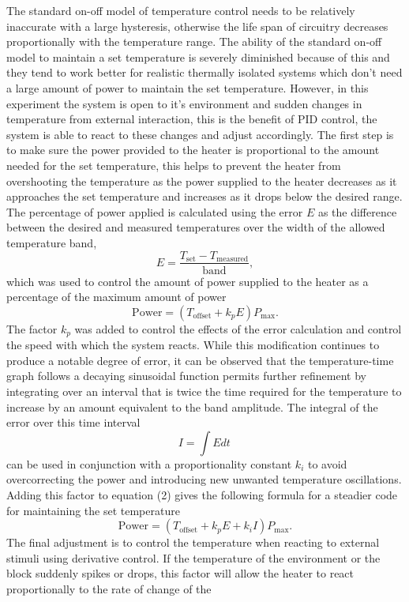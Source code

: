 \documentclass[11pt]{article}
\begin{document}
    The standard on-off model of temperature control needs to be relatively
inaccurate with a large hysteresis, otherwise the life span of circuitry
decreases proportionally with the temperature range. The ability of the
standard on-off model to maintain a set temperature is severely
diminished because of this and they tend to work better for realistic
thermally isolated systems which don't need a large amount of power to
maintain the set temperature. However, in this experiment the system is
open to it's environment and sudden changes in temperature from external
interaction, this is the benefit of PID control, the system is able to
react to these changes and adjust accordingly. The first step is to make
sure the power provided to the heater is proportional to the amount
needed for the set temperature, this helps to prevent the heater from
overshooting the temperature as the power supplied to the heater
decreases as it approaches the set temperature and increases as it drops
below the desired range. The percentage of power applied is calculated
using the error \(E\) as the difference between the desired and measured
temperatures over the width of the allowed temperature band,
\[E = \frac{T_{\text{set}} - T_{\text{measured}}}{\text{band}}, \tag{1}\]
which was used to control the amount of power supplied to the heater as
a percentage of the maximum amount of power
\[ \text{Power} = ( T_{\text{offset}} + k_p E ) P_{\text{max}}. \tag{2}\]
The factor \(k_p\) was added to control the effects of the error
calculation and control the speed with which the system reacts. While
this modification continues to produce a notable degree of error, it can
be observed that the temperature-time graph follows a decaying
sinusoidal function permits further refinement by integrating over an
interval that is twice the time required for the temperature to increase
by an amount equivalent to the band amplitude. The integral of the error
over this time interval \[I = \int {E } dt\, \tag{3}\] can be used in
conjunction with a proportionality constant \(k_i\) to avoid
overcorrecting the power and introducing new unwanted temperature
oscillations. Adding this factor to equation (2) gives the following
formula for a steadier code for maintaining the set temperature
\[\text{Power} = ( T_{\text{offset}} + k_p E + k_i I) P_{\text{max}}. \tag{4}\]
The final adjustment is to control the temperature when reacting to
external stimuli using derivative control. If the temperature of the
environment or the block suddenly spikes or drops, this factor will
allow the heater to react proportionally to the rate of change of the
\end{document}
